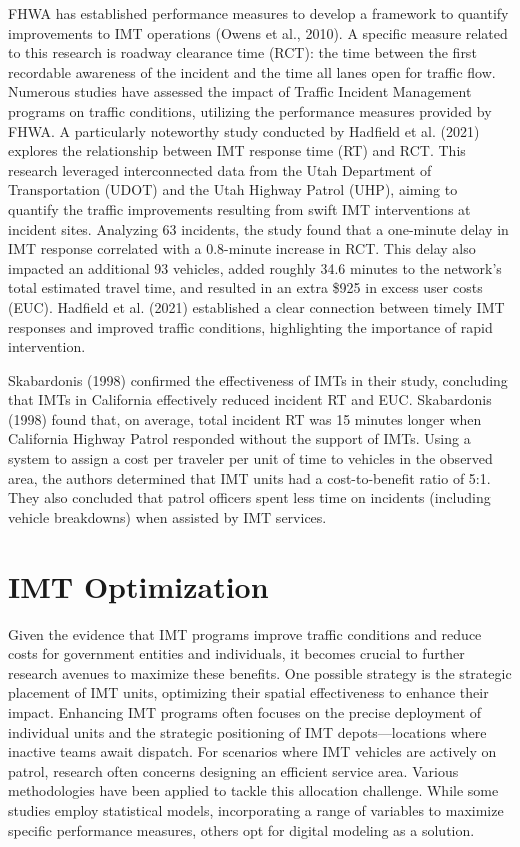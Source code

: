 \documentclass[fancy, oneside, mastersfancy, ms]{byuthesis}
\begin{document}
FHWA has established performance measures to develop a framework to
quantify improvements to IMT operations (Owens et al., 2010). A specific
measure related to this research is roadway clearance time (RCT): the
time between the first recordable awareness of the incident and the time
all lanes open for traffic flow. Numerous studies have assessed the
impact of Traffic Incident Management programs on traffic conditions,
utilizing the performance measures provided by FHWA. A particularly
noteworthy study conducted by Hadfield et al. (2021) explores the
relationship between IMT response time (RT) and RCT. This research
leveraged interconnected data from the Utah Department of Transportation
(UDOT) and the Utah Highway Patrol (UHP), aiming to quantify the traffic
improvements resulting from swift IMT interventions at incident sites.
Analyzing 63 incidents, the study found that a one-minute delay in IMT
response correlated with a 0.8-minute increase in RCT. This delay also
impacted an additional 93 vehicles, added roughly 34.6 minutes to the
network's total estimated travel time, and resulted in an extra \$925 in
excess user costs (EUC). Hadfield et al. (2021) established a clear
connection between timely IMT responses and improved traffic conditions,
highlighting the importance of rapid intervention.

Skabardonis (1998) confirmed the effectiveness of IMTs in their study,
concluding that IMTs in California effectively reduced incident RT and
EUC. Skabardonis (1998) found that, on average, total incident RT was 15
minutes longer when California Highway Patrol responded without the
support of IMTs. Using a system to assign a cost per traveler per unit
of time to vehicles in the observed area, the authors determined that
IMT units had a cost-to-benefit ratio of 5:1. They also concluded that
patrol officers spent less time on incidents (including vehicle
breakdowns) when assisted by IMT services.

\hypertarget{sec-lit_imt_opt}{%
\section{IMT Optimization}\label{sec-lit_imt_opt}}

Given the evidence that IMT programs improve traffic conditions and
reduce costs for government entities and individuals, it becomes crucial
to further research avenues to maximize these benefits. One possible
strategy is the strategic placement of IMT units, optimizing their
spatial effectiveness to enhance their impact. Enhancing IMT programs
often focuses on the precise deployment of individual units and the
strategic positioning of IMT depots---locations where inactive teams
await dispatch. For scenarios where IMT vehicles are actively on patrol,
research often concerns designing an efficient service area. Various
methodologies have been applied to tackle this allocation challenge.
While some studies employ statistical models, incorporating a range of
variables to maximize specific performance measures, others opt for
digital modeling as a solution.
\end{document}
